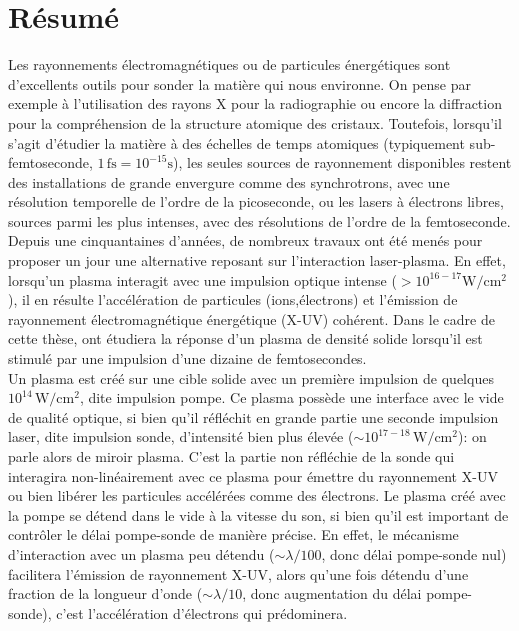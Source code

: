 \chapter*{Résumé}

Les rayonnements électromagnétiques ou de particules énergétiques sont d'excellents outils pour sonder la matière qui nous environne. On pense par exemple à l'utilisation des rayons X pour la radiographie ou encore la diffraction pour la compréhension de la structure atomique des cristaux. Toutefois, lorsqu'il s'agit d'étudier la matière à des échelles de temps atomiques (typiquement sub-femtoseconde, $1\,\mathrm{fs}=10^{-15}\mathrm{s}$), les seules sources de rayonnement disponibles restent des installations de grande envergure comme des synchrotrons, avec une résolution temporelle de l'ordre de la picoseconde, ou les lasers à électrons libres, sources parmi les plus intenses, avec des résolutions de l'ordre de la femtoseconde. Depuis une cinquantaines d'années, de nombreux travaux ont été menés pour proposer un jour une alternative reposant sur l'interaction laser-plasma. En effet, lorsqu'un plasma interagit avec une impulsion optique intense ($> 10^{16-17}\mathrm{W/cm^2}$), il en résulte l'accélération de particules (ions,électrons) et l'émission de rayonnement électromagnétique énergétique (X-UV) cohérent. Dans le cadre de cette thèse, ont étudiera la réponse d'un plasma de densité solide lorsqu'il est stimulé par une impulsion d'une dizaine de femtosecondes.\\
 Un plasma est créé sur une cible solide avec un première impulsion de quelques $10^{14}\,\mathrm{W/cm^2}$, dite impulsion pompe. Ce plasma possède une interface avec le vide de qualité optique, si bien qu'il réfléchit en grande partie une seconde impulsion laser, dite impulsion sonde, d'intensité bien plus élevée ($\sim 10^{17-18}\,\mathrm{W/cm^2}$): on parle alors de miroir plasma. C'est la partie non réfléchie de la sonde qui interagira non-linéairement avec ce plasma pour émettre du rayonnement X-UV ou bien libérer les particules accélérées comme des électrons.  Le plasma créé avec la pompe se détend dans le vide à la vitesse du son, si bien qu'il est important de contrôler le délai pompe-sonde de manière précise. En effet, le mécanisme d'interaction avec un plasma peu détendu ($\sim\lambda/100$, donc délai pompe-sonde nul) facilitera l'émission de rayonnement X-UV, alors qu'une fois détendu d'une fraction de la longueur d'onde ($\sim\lambda/10$, donc augmentation du délai pompe-sonde), c'est l'accélération d'électrons qui prédominera. \\

